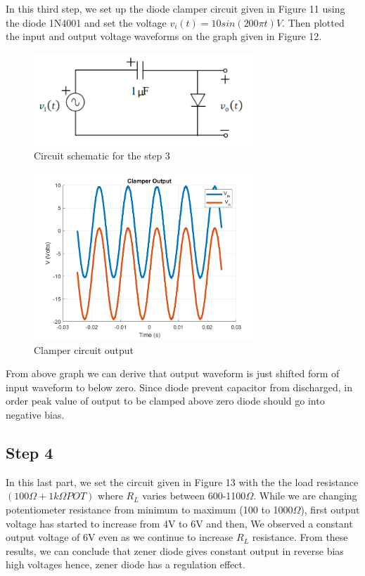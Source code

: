 \documentclass[letterpaper,12pt]{article}
\begin{document}
In this third step, we set up the diode clamper circuit given in Figure 11 using the diode 1N4001 and set the voltage \(v_i(t) = 10sin(200\pi t) V\). Then plotted the input and output voltage waveforms on the graph given in Figure 12.

\begin{figure}[H]
    \centering
    \includegraphics[width = 0.75\textwidth]{3_1.png}
    \caption{Circuit schematic for the step 3}
\end{figure} 
    

\begin{figure}[H]
    \centering
    \includegraphics[width = 0.75\textwidth]{3.png}
    \caption{Clamper circuit output }
\end{figure} 
    
From above graph we can derive that output waveform is just shifted form of input waveform to below zero. Since diode prevent capacitor from discharged, in order peak value of output to be clamped above zero diode should go into negative bias.



\subsection{Step 4}

In this last part, we set the circuit given in Figure 13 with the the load
resistance \( (100\Omega+1k\Omega POT) \) where \(R_L\) varies between 600-1100\(\Omega\). While we are changing potentiometer resistance from minimum to maximum (100 to 1000\(\Omega\)), first output voltage has started to increase from 4V to 6V and then, We observed a constant output voltage of 6V even as we continue to increase \(R_L\) resistance. From these results, we can conclude that zener diode gives constant output in reverse bias high voltages hence, zener diode has a regulation effect. 
\end{document}
